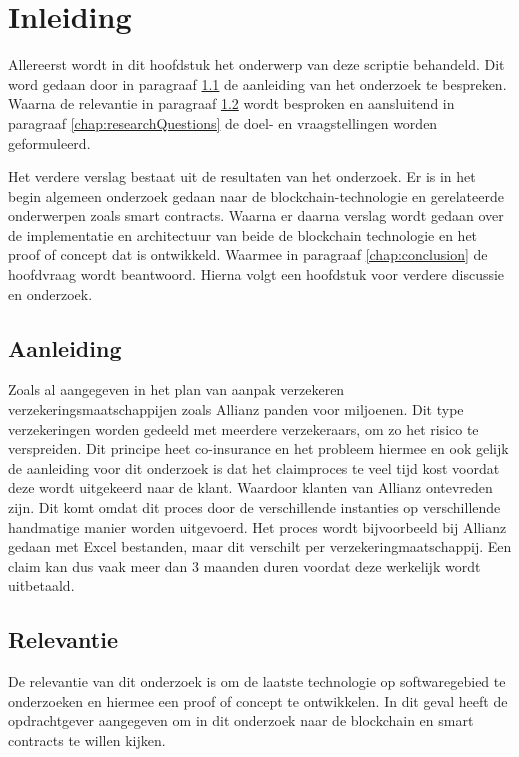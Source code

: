 \chapter{Inleiding}
Allereerst wordt in dit hoofdstuk het onderwerp van deze scriptie behandeld. Dit word gedaan door in paragraaf \ref{chap:motivation} de aanleiding van het onderzoek te bespreken. Waarna de relevantie in paragraaf \ref{chap:relevance} wordt besproken en aansluitend in paragraaf \ref{chap:researchQuestions} de doel- en vraagstellingen worden geformuleerd.

Het verdere verslag bestaat uit de resultaten van het onderzoek. Er is in het begin algemeen onderzoek gedaan naar de blockchain-technologie en gerelateerde onderwerpen zoals smart contracts. Waarna er daarna verslag wordt gedaan over de implementatie en architectuur van beide de blockchain technologie en het proof of concept dat is ontwikkeld. Waarmee in paragraaf \ref{chap:conclusion} de hoofdvraag wordt beantwoord. Hierna volgt een hoofdstuk voor verdere discussie en onderzoek.

\section{Aanleiding}\label{chap:motivation}
Zoals al aangegeven in het plan van aanpak \cite{pva} verzekeren verzekeringsmaatschappijen zoals Allianz panden voor miljoenen. Dit type verzekeringen worden gedeeld met meerdere verzekeraars, om zo het risico te verspreiden. Dit principe heet co-insurance en het probleem hiermee en ook gelijk de aanleiding voor dit onderzoek is dat het claimproces te veel tijd kost voordat deze wordt uitgekeerd naar de klant. Waardoor klanten van Allianz ontevreden zijn. Dit komt omdat dit proces door de verschillende instanties op verschillende handmatige manier worden uitgevoerd. Het proces wordt bijvoorbeeld bij Allianz gedaan met Excel bestanden, maar dit verschilt per verzekeringmaatschappij. Een claim kan dus vaak meer dan 3 maanden duren voordat deze werkelijk wordt uitbetaald.

\section{Relevantie}\label{chap:relevance}
De relevantie van dit onderzoek is om de laatste technologie op softwaregebied te onderzoeken en hiermee een proof of concept te ontwikkelen. In dit geval heeft de opdrachtgever aangegeven om in dit onderzoek naar de blockchain en smart contracts te willen kijken.

